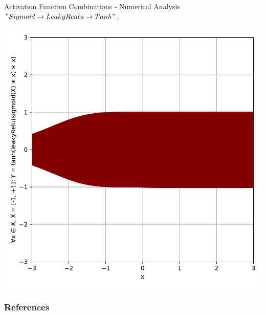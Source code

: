 \documentclass{beamer}
\begin{document}
		\begin{frame}{Activation Function Combinations - Numerical Analysis}
			$" Sigmoid \rightarrow LeakyRealu \rightarrow Tanh "$.
			\begin{center}
				\includegraphics[height=0.88\textheight]{sigmoid_leakyRelu_tanh}
			\end{center}
		\end{frame}
		\begin{frame}
			\frametitle{References}
			
			
		\end{frame}
\end{document}
